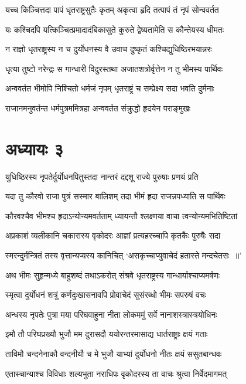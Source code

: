 \twolineshloka
{यच्च किञ्चित्तदा पापं धृतराष्ट्रसुतैः कृतम्}
{अकृत्वा हृदि तत्पापं तं नृपं सोन्ववर्तत}


\twolineshloka
{यः कश्चिदपि यत्किञ्चित्प्रमादादंबिकासुते}
{कुरुते द्वेष्यतामेति स कौन्तेयस्य धीमतः}


\twolineshloka
{न राज्ञो धृतराष्ट्रस्य न च दुर्योधनस्य वै}
{उवाच दुष्कृतं कश्चिद्युधिष्ठिरभयान्नरः}


\twolineshloka
{धृत्या तुष्टो नरेन्द्रः स गान्धारी विदुरस्तथा}
{अजातशत्रोर्वृत्तेन न तु भीमस्य पार्थिवः}


\twolineshloka
{अन्ववर्तत भीमोपि निश्चितो धर्मजं नृपम्}
{धृतराष्ट्रं च सम्प्रेक्ष्य सदा भवति दुर्मनाः}


\twolineshloka
{राजानमनुवर्तन्त धर्मपुत्रममित्रहा}
{अन्ववर्तत संक्रुद्धो हृदयेन पराङ्मुखः}


\chapter{अध्यायः ३}
\twolineshloka
{युधिष्ठिरस्य नृपतेर्दुर्योधनपितुस्तदा}
{नान्तरं दद्दशू राज्ये पुरुषाः प्रणयं प्रति}


\twolineshloka
{यदा तु कौरवो राजा पुत्रं सस्मार बालिशम्}
{तदा भीमं हृदा राजन्नपध्याति स पार्थिवः}


\twolineshloka
{कौरवश्चैव भीमश्च हृदाऽन्योन्यमवर्तताम्}
{ध्यायन्तौ श्लक्ष्णया वाचा त्वन्योन्यमभितिष्टितां}


\twolineshloka
{अप्रकाशं व्यलीकानि चकारास्य वृकोदरः}
{आज्ञां प्रत्यहरच्चापि कृतकैः पुरुषैः सदा}


\twolineshloka
{स्मरन्दुर्मन्त्रितं तस्य वृत्तान्यप्यस्य कानिचित्}
{`असकृच्चाप्युवाचेदं हतास्ते मन्दचेतसः ॥'}


\twolineshloka
{अथ भीमः सुहृन्मध्ये बाहुशब्दं तथाऽकरोत्}
{संश्रवे धृतराष्ट्रस्य गान्धार्याश्चाप्यमर्षणः}


\twolineshloka
{स्मृत्वा दुर्योधनं शत्रुं कर्णदुःखासनावपि}
{प्रोवाचेदं सुसंरब्धो भीमः सपरुषं वचः}


\twolineshloka
{अन्धस्य नृपतेः पुत्रा मया परिघवाहुना}
{नीता लोकममुं सर्वे नानाशस्त्रास्त्रयोधिनः}


\twolineshloka
{इमौ तौ परिघप्रख्यौ भुजौ मम दुरासदौ}
{ययोरन्तरमासाद्य धार्तराष्ट्राः क्षयं गताः}


\twolineshloka
{ताविमौ चन्दनेनाकौ वन्दनीयौ च मे भुजौ}
{याभ्यां दुर्योधनो नीतः क्षयं ससुतबान्धवः}


\twolineshloka
{एतास्चान्याश्च विविधाः शल्यभुता नराधिपः}
{वृकोदरस्य ता वाचः श्रुत्वा निर्वेदमागमत्}


